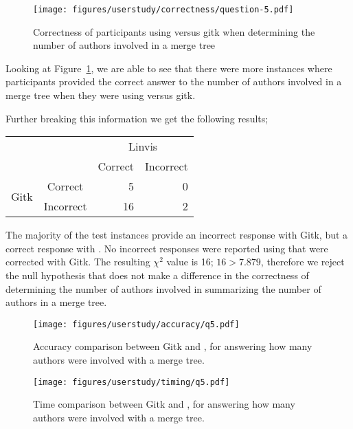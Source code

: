 \begin{figure}[htpb]
  \centering
  \texttt{[image: figures/userstudy/correctness/question-5.pdf]}
  \caption{Correctness of participants using \tool versus gitk when
    determining the number of authors involved in a merge tree}
  \label{fig:q_5_correctness}
\end{figure}

Looking at Figure~\ref{fig:q_5_correctness}, we are able to see that
there were more instances where participants provided the correct answer
to the number of authors involved in a merge tree when they were using
\tool versus gitk.


Further breaking this information we get the following results;

\begin{center}
  \begin{tabular}{cc|rr}
                           &           & \multicolumn{2}{c}{Linvis}\\
                           &           & Correct                      & Incorrect\\\hline
    \multirow{2}{*}{Gitk}  & Correct   & 5                            & 0\\
                           & Incorrect & 16                           & 2\\
  \end{tabular}
\end{center}

The majority of the test instances provide an incorrect response with
Gitk, but a correct response with \tool. No incorrect responses were
reported using \tool that were corrected with Gitk. The resulting
$\chi^2$ value is 16; $16 > 7.879$, therefore we reject the null
hypothesis that \tool does not make a difference in the correctness of
determining the number of authors involved in summarizing the number of
authors in a merge tree.

\begin{figure}[htpb]
  \centering
  \texttt{[image: figures/userstudy/accuracy/q5.pdf]}
  \caption{Accuracy comparison between Gitk and \tool, for answering how
  many authors were involved with a merge tree.}
  \label{fig:q5_accuracy}
\end{figure}

\begin{figure}[htpb]
  \centering
  \texttt{[image: figures/userstudy/timing/q5.pdf]}
  \caption{Time comparison between Gitk and \tool, for answering how
  many authors were involved with a merge tree.}
  \label{fig:q5_timing}
\end{figure}


